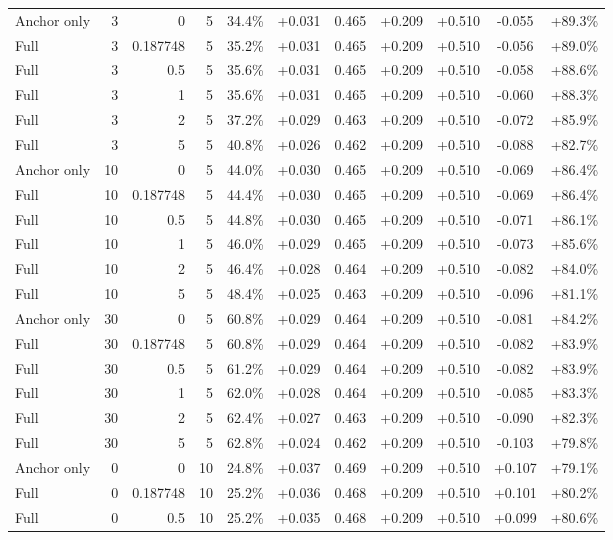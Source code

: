 \begin{table}[htbp]
\begin{tabular}{lrrrccccccc}
Anchor only & 3 & 0 & 5 & 34.4\% & +0.031 & 0.465 & +0.209 & +0.510 & -0.055 & +89.3\% \\
Full & 3 & 0.187748 & 5 & 35.2\% & +0.031 & 0.465 & +0.209 & +0.510 & -0.056 & +89.0\% \\
Full & 3 & 0.5 & 5 & 35.6\% & +0.031 & 0.465 & +0.209 & +0.510 & -0.058 & +88.6\% \\
Full & 3 & 1 & 5 & 35.6\% & +0.031 & 0.465 & +0.209 & +0.510 & -0.060 & +88.3\% \\
Full & 3 & 2 & 5 & 37.2\% & +0.029 & 0.463 & +0.209 & +0.510 & -0.072 & +85.9\% \\
Full & 3 & 5 & 5 & 40.8\% & +0.026 & 0.462 & +0.209 & +0.510 & -0.088 & +82.7\% \\
Anchor only & 10 & 0 & 5 & 44.0\% & +0.030 & 0.465 & +0.209 & +0.510 & -0.069 & +86.4\% \\
Full & 10 & 0.187748 & 5 & 44.4\% & +0.030 & 0.465 & +0.209 & +0.510 & -0.069 & +86.4\% \\
Full & 10 & 0.5 & 5 & 44.8\% & +0.030 & 0.465 & +0.209 & +0.510 & -0.071 & +86.1\% \\
Full & 10 & 1 & 5 & 46.0\% & +0.029 & 0.465 & +0.209 & +0.510 & -0.073 & +85.6\% \\
Full & 10 & 2 & 5 & 46.4\% & +0.028 & 0.464 & +0.209 & +0.510 & -0.082 & +84.0\% \\
Full & 10 & 5 & 5 & 48.4\% & +0.025 & 0.463 & +0.209 & +0.510 & -0.096 & +81.1\% \\
Anchor only & 30 & 0 & 5 & 60.8\% & +0.029 & 0.464 & +0.209 & +0.510 & -0.081 & +84.2\% \\
Full & 30 & 0.187748 & 5 & 60.8\% & +0.029 & 0.464 & +0.209 & +0.510 & -0.082 & +83.9\% \\
Full & 30 & 0.5 & 5 & 61.2\% & +0.029 & 0.464 & +0.209 & +0.510 & -0.082 & +83.9\% \\
Full & 30 & 1 & 5 & 62.0\% & +0.028 & 0.464 & +0.209 & +0.510 & -0.085 & +83.3\% \\
Full & 30 & 2 & 5 & 62.4\% & +0.027 & 0.463 & +0.209 & +0.510 & -0.090 & +82.3\% \\
Full & 30 & 5 & 5 & 62.8\% & +0.024 & 0.462 & +0.209 & +0.510 & -0.103 & +79.8\% \\
Anchor only & 0 & 0 & 10 & 24.8\% & +0.037 & 0.469 & +0.209 & +0.510 & +0.107 & +79.1\% \\
Full & 0 & 0.187748 & 10 & 25.2\% & +0.036 & 0.468 & +0.209 & +0.510 & +0.101 & +80.2\% \\
Full & 0 & 0.5 & 10 & 25.2\% & +0.035 & 0.468 & +0.209 & +0.510 & +0.099 & +80.6\% \\

\end{tabular}
\end{table}
